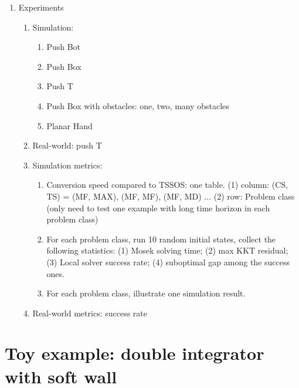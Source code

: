 \begin{enumerate}
    \item Experiments 
    \begin{enumerate}
        \item Simulation: 
        \begin{enumerate}
            \item Push Bot 
            \item Push Box 
            \item Push T 
            \item Push Box with obstacles: one, two, many obstacles 
            \item Planar Hand 
        \end{enumerate}
        \item Real-world: push T 
        \item Simulation metrics:
        \begin{enumerate}
            \item Conversion speed compared to TSSOS: one table. (1) column: (CS, TS) = (MF, MAX), (MF, MF), (MF, MD) ... (2) row: Problem class (only need to test one example with long time horizon in each problem class)
            \item For each problem class, run 10 random initial states, collect the following statistics: (1) Mosek solving time; (2) max KKT residual; (3) Local solver success rate; (4) suboptimal gap among the success ones.
            \item For each problem class, illustrate one simulation result.
        \end{enumerate}
        \item Real-world metrics: success rate 
    \end{enumerate}
\end{enumerate}

\section{Toy example: double integrator with soft wall}

